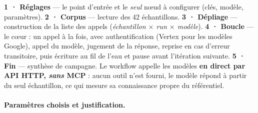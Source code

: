 \noindent\textbf{1 · Réglages} — le point d'entrée et le \emph{seul} nœud à
configurer (clés, modèle, paramètres). \textbf{2 · Corpus} — lecture des 42
échantillons. \textbf{3 · Dépliage} — construction de la liste des appels
(\emph{échantillon $\times$ run $\times$ modèle}). \textbf{4 · Boucle} — le cœur :
un appel à la fois, avec authentification (Vertex pour les modèles Google), appel
du modèle, jugement de la réponse, reprise en cas d'erreur transitoire, puis
écriture au fil de l'eau et pause avant l'itération suivante. \textbf{5 · Fin} —
synthèse de campagne. Le workflow appelle les modèles \textbf{en direct par API
HTTP, \emph{sans} MCP} : aucun outil n'est fourni, le modèle répond à partir du
seul échantillon, ce qui mesure sa connaissance propre du référentiel.

\paragraph{Paramètres choisis et justification.}
